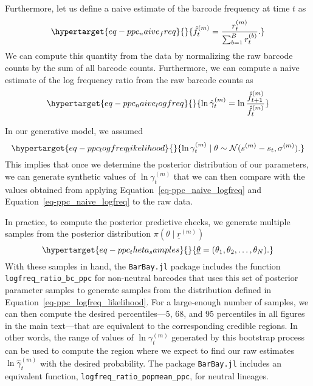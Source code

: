 \documentclass[
]{scrartcl}
\begin{document}
\begin{refsegment}
Furthermore, let us define a naive estimate of the barcode frequency at
time \(t\) as \begin{equation}\protect\hypertarget{eq-ppc_naive_freq}{}{
\hat{f}_t^{(m)} = \frac{r^{(m)}_t}{\sum_{b=1}^B r^{(b)}_t}.
}\label{eq-ppc_naive_freq}\end{equation} We can compute this quantity
from the data by normalizing the raw barcode counts by the sum of all
barcode counts. Furthermore, we can compute a naive estimate of the log
frequency ratio from the raw barcode counts as
\begin{equation}\protect\hypertarget{eq-ppc_naive_logfreq}{}{
\ln \hat{\gamma}_t^{(m)} = \ln \frac{\hat{f}_{t+1}^{(m)}}{\hat{f}_t^{(m)}}
}\label{eq-ppc_naive_logfreq}\end{equation}

In our generative model, we assumed
\begin{equation}\protect\hypertarget{eq-ppc_logfreq_likelihood}{}{
\ln\gamma^{(m)}_t \mid \theta \sim \mathcal{N}(s^{(m)} - s_t, \sigma^{(m)}).
}\label{eq-ppc_logfreq_likelihood}\end{equation} This implies that once
we determine the posterior distribution of our parameters, we can
generate synthetic values of \(\ln \gamma^{(m)}_t\) that we can then
compare with the values obtained from applying
Equation~\ref{eq-ppc_naive_logfreq} and
Equation~\ref{eq-ppc_naive_logfreq} to the raw data.

In practice, to compute the posterior predictive checks, we generate
multiple samples from the posterior distribution
\(\pi(\theta \mid \underline{r}^{(m)})\)
\begin{equation}\protect\hypertarget{eq-ppc_theta_samples}{}{
\underline{\theta} = (\theta_1, \theta_2, \ldots, \theta_N).
}\label{eq-ppc_theta_samples}\end{equation} With these samples in hand,
the \texttt{BarBay.jl} package includes the function
\texttt{logfreq\_ratio\_bc\_ppc} for non-neutral barcodes that uses this
set of posterior parameter samples to generate samples from the
distribution defined in Equation~\ref{eq-ppc_logfreq_likelihood}. For a
large-enough number of samples, we can then compute the desired
percentiles---5, 68, and 95 percentiles in all figures in the main
text---that are equivalent to the corresponding credible regions. In
other words, the range of values of \(\ln\gamma_t^{(m)}\) generated by
this bootstrap process can be used to compute the region where we expect
to find our raw estimates \(\ln\hat{\gamma}_t^{(m)}\) with the desired
probability. The package \texttt{BarBay.jl} includes an equivalent
function, \texttt{logfreq\_ratio\_popmean\_ppc}, for neutral lineages.


\end{refsegment}
\end{document}
